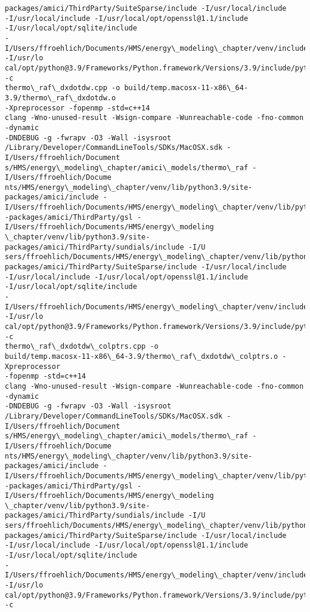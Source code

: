 \documentclass[11pt]{article}
\begin{document}
\begin{Verbatim}[commandchars=\\\{\}]
packages/amici/ThirdParty/SuiteSparse/include -I/usr/local/include
-I/usr/local/include -I/usr/local/opt/openssl@1.1/include
-I/usr/local/opt/sqlite/include
-I/Users/ffroehlich/Documents/HMS/energy\_modeling\_chapter/venv/include -I/usr/lo
cal/opt/python@3.9/Frameworks/Python.framework/Versions/3.9/include/python3.9 -c
thermo\_raf\_dxdotdw.cpp -o build/temp.macosx-11-x86\_64-3.9/thermo\_raf\_dxdotdw.o
-Xpreprocessor -fopenmp -std=c++14
clang -Wno-unused-result -Wsign-compare -Wunreachable-code -fno-common -dynamic
-DNDEBUG -g -fwrapv -O3 -Wall -isysroot
/Library/Developer/CommandLineTools/SDKs/MacOSX.sdk -I/Users/ffroehlich/Document
s/HMS/energy\_modeling\_chapter/amici\_models/thermo\_raf -I/Users/ffroehlich/Docume
nts/HMS/energy\_modeling\_chapter/venv/lib/python3.9/site-packages/amici/include -
I/Users/ffroehlich/Documents/HMS/energy\_modeling\_chapter/venv/lib/python3.9/site
-packages/amici/ThirdParty/gsl -I/Users/ffroehlich/Documents/HMS/energy\_modeling
\_chapter/venv/lib/python3.9/site-packages/amici/ThirdParty/sundials/include -I/U
sers/ffroehlich/Documents/HMS/energy\_modeling\_chapter/venv/lib/python3.9/site-
packages/amici/ThirdParty/SuiteSparse/include -I/usr/local/include
-I/usr/local/include -I/usr/local/opt/openssl@1.1/include
-I/usr/local/opt/sqlite/include
-I/Users/ffroehlich/Documents/HMS/energy\_modeling\_chapter/venv/include -I/usr/lo
cal/opt/python@3.9/Frameworks/Python.framework/Versions/3.9/include/python3.9 -c
thermo\_raf\_dxdotdw\_colptrs.cpp -o
build/temp.macosx-11-x86\_64-3.9/thermo\_raf\_dxdotdw\_colptrs.o -Xpreprocessor
-fopenmp -std=c++14
clang -Wno-unused-result -Wsign-compare -Wunreachable-code -fno-common -dynamic
-DNDEBUG -g -fwrapv -O3 -Wall -isysroot
/Library/Developer/CommandLineTools/SDKs/MacOSX.sdk -I/Users/ffroehlich/Document
s/HMS/energy\_modeling\_chapter/amici\_models/thermo\_raf -I/Users/ffroehlich/Docume
nts/HMS/energy\_modeling\_chapter/venv/lib/python3.9/site-packages/amici/include -
I/Users/ffroehlich/Documents/HMS/energy\_modeling\_chapter/venv/lib/python3.9/site
-packages/amici/ThirdParty/gsl -I/Users/ffroehlich/Documents/HMS/energy\_modeling
\_chapter/venv/lib/python3.9/site-packages/amici/ThirdParty/sundials/include -I/U
sers/ffroehlich/Documents/HMS/energy\_modeling\_chapter/venv/lib/python3.9/site-
packages/amici/ThirdParty/SuiteSparse/include -I/usr/local/include
-I/usr/local/include -I/usr/local/opt/openssl@1.1/include
-I/usr/local/opt/sqlite/include
-I/Users/ffroehlich/Documents/HMS/energy\_modeling\_chapter/venv/include -I/usr/lo
cal/opt/python@3.9/Frameworks/Python.framework/Versions/3.9/include/python3.9 -c

\end{Verbatim}
\end{document}
